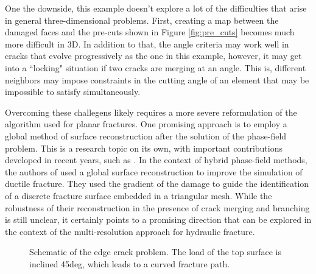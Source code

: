 One the downside, this example doesn't explore a lot of the difficulties that arise in general three-dimensional problems. 
First, creating a map between the damaged faces and the pre-cuts shown in Figure \ref{fig:pre_cuts} becomes much more difficult in 3D. In addition to that, the angle criteria may work well in cracks that evolve progressively as the one in this example, however, it may get into a ``locking" situation if two cracks are merging at an angle. This is, different neighbors may impose constraints in the cutting angle of an element that may be impossible to satisfy simultaneously. 

Overcoming these challegens likely requires a more severe reformulation of the algorithm used for planar fractures. One promising approach is to employ a global method of surface reconstruction after the solution of the phase-field problem. This is a research topic on its own, with important contributions developed in recent years, such as \cite{yang2021explicit, zeng2022tracking, xu2023reconstruct}. In the context of hybrid phase-field methods, the authors of \cite{eldahshan2021cipfar} used a global surface reconstruction to improve the simulation of ductile fracture. They used the gradient of the damage to guide the identification of a discrete fracture surface embedded in a triangular mesh. While the robustness of their reconstruction in the presence of crack merging and branching is still unclear, it certainly points to a promising direction that can be explored in the context of the multi-resolution approach for hydraulic fracture.

\begin{figure}[ht]
    \centering
    \caption{Schematic of the edge crack problem. The load of the top surface is inclined 45deg, which leads to a curved fracture path.}
    \label{fig:nonplanar_schematic}
\end{figure}

